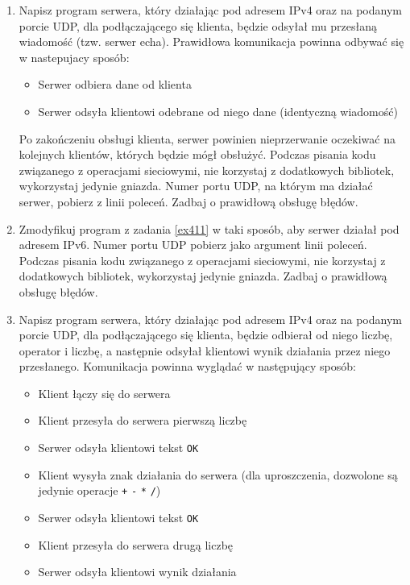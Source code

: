\documentclass{article}
\begin{document}
\begin{enumerate}[label=\textbf{4.\arabic*}, resume]\setlength{\itemsep}{1em}

\item  \label{ex411} Napisz program serwera, który działając  pod adresem IPv4 oraz na podanym porcie UDP, dla podłączającego się klienta, będzie odsyłał mu przesłaną wiadomość (tzw. serwer echa). Prawidłowa komunikacja powinna odbywać się w nastepujacy sposób:

\begin{itemize}
\item Serwer odbiera dane od klienta
\item Serwer odsyła klientowi odebrane od niego dane (identyczną wiadomość) 
\end{itemize}

\noindent Po zakończeniu obsługi klienta, serwer powinien nieprzerwanie oczekiwać na kolejnych klientów, których będzie mógł obsłużyć. Podczas pisania kodu związanego z operacjami sieciowymi, nie korzystaj z dodatkowych bibliotek, wykorzystaj jedynie gniazda. Numer portu UDP, na którym ma działać serwer, pobierz z linii poleceń. Zadbaj o prawidłową obsługę błędów. 
\item Zmodyfikuj program z zadania \ref{ex411} w taki sposób,  aby serwer działał pod adresem IPv6.   Numer portu UDP pobierz jako argument linii poleceń. Podczas pisania kodu związanego z operacjami sieciowymi, nie korzystaj z dodatkowych bibliotek, wykorzystaj jedynie gniazda. Zadbaj o prawidłową obsługę błędów.
\item \label{ex413} Napisz program serwera, który działając  pod adresem IPv4 oraz na podanym porcie UDP, dla podłączającego się klienta, będzie odbierał od niego liczbę, operator i liczbę, a następnie odsyłał klientowi wynik działania przez niego przesłanego. Komunikacja powinna wyglądać w następujący sposób:

\begin{itemize}
\item Klient łączy się do serwera
\item Klient przesyła do serwera pierwszą liczbę
\item Serwer odsyła klientowi tekst \texttt{OK}
\item Klient wysyła znak działania do serwera (dla uproszczenia, dozwolone są jedynie operacje \texttt{+} \texttt{-} \texttt{*} \texttt{/})
\item Serwer odsyła klientowi tekst \texttt{OK}
\item Klient przesyła do serwera drugą liczbę
\item Serwer odsyła klientowi wynik działania
\end{itemize}


\end{enumerate}
\end{document}
